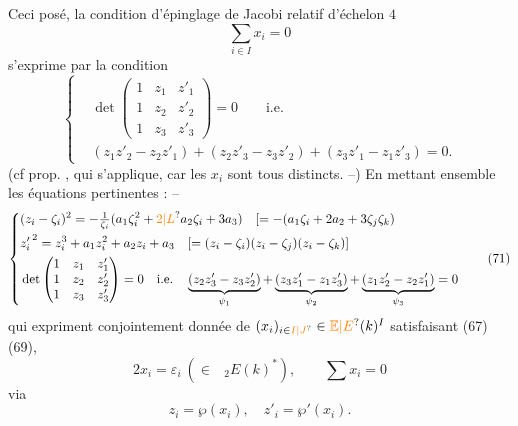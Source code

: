 Ceci posé, la condition d'épinglage de Jacobi relatif d'échelon $4$
\[
 \sum_{i\in I}x_i=0 \tag*{(69)}
\]
s'exprime par la condition
\[
 \left\{\begin{aligned}
 &\det\begin{pmatrix}1&z_1&z'_1\\1&z_2&z'_2\\1&z_3&z'_3\end{pmatrix}=0\qquad\text{i.e.}\\
 &(z_1z'_2-z_2z'_1)+(z_2z'_3-z_3z'_2)+(z_3z'_1-z_1z'_3)=0.
 \end{aligned}\right. \tag*{(70)}
\]
(cf prop. , qui s'applique, car les $x_i$ sont tous distincts. --)
En mettant ensemble les équations pertinentes : --
\[
 \left\{\begin{aligned}
 &(z_i-\zeta_i)^2=-\tfrac1{\zeta_i}(a_1\zeta_i^2+\unsure{2|L}a_2\zeta_i+3a_3)\quad [=-(a_1\zeta_i+2a_2+3\zeta_j\zeta_k)\\
 &{z'_i}^{\,2}=z_i^3+a_1z_i^2+a_2z_i+a_3\quad [=(z_i-\zeta_i)(z_i-\zeta_j)(z_i-\zeta_k)]\\
 &\det\begin{pmatrix}1&z_1&z'_1\\1&z_2&z'_2\\1&z_3&z'_3\end{pmatrix}=0\quad\text{i.e.}\quad
 \underbrace{(z_2z'_3-z_3z'_2)}_{\psi_1}+\underbrace{(z_3z'_1-z_1z'_3)}_{\psi_2}+\underbrace{(z_1z'_2-z_2z'_1)}_{\psi_3}=0
 \end{aligned}\right. \tag*{(71)}
\]
\margin{\uline{NB.} $[\psi_i^\omega=z_jz'_k-z_kz'_j\quad j=\omega i,\ k=\omega^2i=\omega j$}
qui expriment conjointement  donnée de $(x_i)_{i\in\unsure{I|J}}\in\unsure{\mathbb{E}|E}(k)^I$ satisfaisant (67) (69),
\[
 2x_i=\varepsilon_i\ (\in\phantom{E}_2E(k)^*),\qquad \sum x_i=0 \tag*{(72)}
\]
via
\[
 z_i=\wp(x_i),\quad z'_i=\wp'(x_i). \tag*{(73)}
\]


